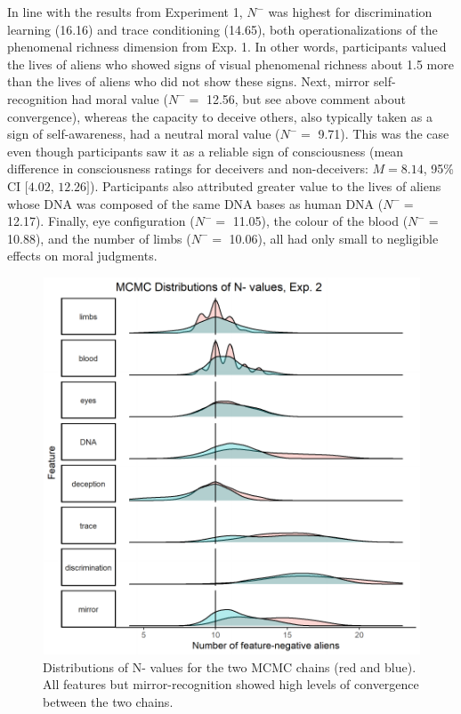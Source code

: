 \documentclass[10pt, letterpaper]{article}
\newenvironment{CodeChunk}{}{}
\begin{document}
In line with the results from Experiment 1, \(N^-\) was highest for
discrimination learning (16.16) and trace conditioning (14.65), both
operationalizations of the phenomenal richness dimension from Exp. 1. In
other words, participants valued the lives of aliens who showed signs of
visual phenomenal richness about 1.5 more than the lives of aliens who
did not show these signs. Next, mirror self-recognition had moral value
(\(N^-=\) 12.56, but see above comment about convergence), whereas the
capacity to deceive others, also typically taken as a sign of
self-awareness, had a neutral moral value (\(N^-=\) 9.71). This was the
case even though participants saw it as a reliable sign of consciousness
(mean difference in consciousness ratings for deceivers and
non-deceivers: \(M = 8.14\), 95\% CI \([4.02\), \(12.26]\)).
Participants also attributed greater value to the lives of aliens whose
DNA was composed of the same DNA bases as human DNA (\(N^-=\) 12.17).
Finally, eye configuration (\(N^-=\) 11.05), the colour of the blood
(\(N^-=\) 10.88), and the number of limbs (\(N^-=\) 10.06), all had only
small to negligible effects on moral judgments.

\begin{CodeChunk}
\begin{figure}[H]

{\centering \includegraphics{figs/mwjplot2-1} 

}

\caption[Distributions of N- values for the two MCMC chains (red and blue)]{Distributions of N- values for the two MCMC chains (red and blue). All features but mirror-recognition showed high levels of convergence between the two chains.}\label{fig:mwjplot2}
\end{figure}
\end{CodeChunk}
\end{document}
